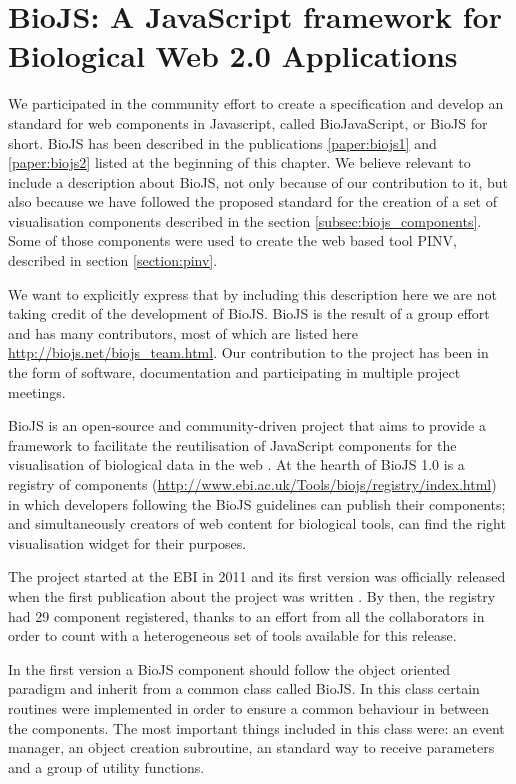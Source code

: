 \section{BioJS: A JavaScript framework for Biological Web 2.0 Applications }
We participated in the community effort to create a specification and develop an standard for web components in Javascript, called BioJavaScript, or BioJS for short. BioJS has been described in the publications \ref{paper:biojs1} and \ref{paper:biojs2} listed at the beginning of this chapter. We believe relevant to include a description about BioJS, not only because of our contribution to it, but also because we have followed the proposed standard for the creation of a set of visualisation components described in the section \ref{subsec:biojs_components}. Some of those components were used to create the web based tool PINV, described in section \ref{section:pinv}.

We want to explicitly express that by including this description here we are not taking credit of the development of BioJS. BioJS is the result of a group effort and has many contributors, most of which are listed here \url{http://biojs.net/biojs_team.html}. Our contribution to the project has been in the form of software, documentation and participating in multiple project meetings.

BioJS is an open-source and community-driven project that aims to provide a framework to facilitate the reutilisation of JavaScript components for the visualisation of biological data in the web \cite{GOM2013}. At the hearth of BioJS 1.0 is a registry of components (\url{http://www.ebi.ac.uk/Tools/biojs/registry/index.html}) in which developers following the BioJS guidelines can publish their components; and simultaneously creators of web content for biological tools, can find the right visualisation widget for their purposes.

The project started at the EBI in 2011 and its first version was officially released when the first publication about the project was written \cite{GOM2013}. By then, the registry had 29 component registered, thanks to an effort from all the collaborators in order to count with a heterogeneous set of tools available for this release.

In the first version a BioJS component should follow the object oriented paradigm and inherit from a common class called BioJS. In this class certain routines were implemented in order to ensure a common behaviour in between the components. The most important things included in this class were: an event manager, an object creation subroutine, an standard way to receive parameters and a group of utility functions.

